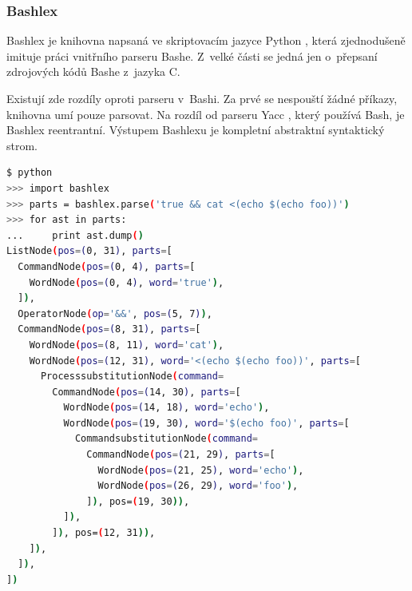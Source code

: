 \documentclass[thesis=M,czech]{FITthesis}[2012/06/26]
\begin{document}





%
%
%
\subsubsection{Bashlex}\label{sec:bashlex}

Bashlex \cite{bashlex} je knihovna napsaná ve skriptovacím jazyce Python \cite{Python}, která zjednodušeně imituje práci vnitřního parseru Bashe. Z~velké části se jedná jen o~přepsaní zdrojových kódů Bashe z~jazyka C.

Existují zde rozdíly oproti parseru v~Bashi. Za prvé se nespouští žádné příkazy, knihovna umí pouze parsovat. Na rozdíl od parseru Yacc \cite{yacc}, který používá Bash, je Bashlex reentrantní. Výstupem Bashlexu je kompletní abstraktní syntaktický strom.

\noindent
\begin{minipage}{\linewidth}
\begin{lstlisting}[language=bash, caption={Výstup z~knihovny Bashlex}, label={lst:bashlex}]
$ python
>>> import bashlex
>>> parts = bashlex.parse('true && cat <(echo $(echo foo))')
>>> for ast in parts:
...     print ast.dump()
ListNode(pos=(0, 31), parts=[
  CommandNode(pos=(0, 4), parts=[
    WordNode(pos=(0, 4), word='true'),
  ]),
  OperatorNode(op='&&', pos=(5, 7)),
  CommandNode(pos=(8, 31), parts=[
    WordNode(pos=(8, 11), word='cat'),
    WordNode(pos=(12, 31), word='<(echo $(echo foo))', parts=[
      ProcesssubstitutionNode(command=
        CommandNode(pos=(14, 30), parts=[
          WordNode(pos=(14, 18), word='echo'),
          WordNode(pos=(19, 30), word='$(echo foo)', parts=[
            CommandsubstitutionNode(command=
              CommandNode(pos=(21, 29), parts=[
                WordNode(pos=(21, 25), word='echo'),
                WordNode(pos=(26, 29), word='foo'),
              ]), pos=(19, 30)),
          ]),
        ]), pos=(12, 31)),
    ]),
  ]),
])
\end{lstlisting}
\end{minipage}
\end{document}
